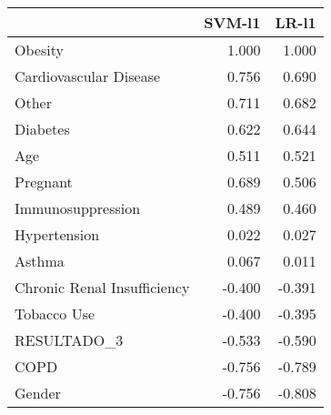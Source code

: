\begin{tabular}{lrr}
\toprule
{} &  SVM-l1 &  LR-l1 \\
\midrule
Obesity                     &   1.000 &  1.000 \\
Cardiovascular Disease      &   0.756 &  0.690 \\
Other                       &   0.711 &  0.682 \\
Diabetes                    &   0.622 &  0.644 \\
Age                         &   0.511 &  0.521 \\
Pregnant                    &   0.689 &  0.506 \\
Immunosuppression           &   0.489 &  0.460 \\
Hypertension                &   0.022 &  0.027 \\
Asthma                      &   0.067 &  0.011 \\
Chronic Renal Insufficiency &  -0.400 & -0.391 \\
Tobacco Use                 &  -0.400 & -0.395 \\
RESULTADO\_3                 &  -0.533 & -0.590 \\
COPD                        &  -0.756 & -0.789 \\
Gender                      &  -0.756 & -0.808 \\
\bottomrule
\end{tabular}

